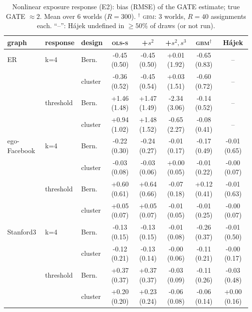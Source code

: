 \begin{table}[t]\centering\footnotesize\setlength{\tabcolsep}{3.5pt}
\caption{Nonlinear exposure response (E2): bias (RMSE) of the GATE estimate; true GATE $\approx2$. Mean over 6 worlds ($R{=}300$). $^\dagger$ \textsc{gbm}: 3 worlds, $R{=}40$ assignments each. ``--'': H\'ajek undefined in $\ge50\%$ of draws (or not run).}
\label{tab:extrap}
\begin{tabular}{lllccccc}\toprule
graph & response & design & \textsc{ols-s} & +$s^2$ & +$s^2,s^3$ & \textsc{gbm}$^\dagger$ & H\'ajek \\
\midrule
ER & k=4 & Bern. & -0.45 (0.50) & -0.45 (0.50) & +0.01 (1.92) & -0.65 (0.83) & -- \\
 &  & cluster & -0.36 (0.52) & -0.45 (0.54) & +0.03 (1.51) & -0.60 (0.72) & -- \\
 & threshold & Bern. & +1.46 (1.48) & +1.47 (1.49) & -2.34 (3.06) & -0.14 (0.52) & -- \\
 &  & cluster & +0.94 (1.02) & +1.48 (1.52) & -0.65 (2.27) & -0.08 (0.41) & -- \\
ego-Facebook & k=4 & Bern. & -0.22 (0.30) & -0.24 (0.27) & -0.01 (0.17) & -0.17 (0.49) & -0.01 (0.65) \\
 &  & cluster & -0.03 (0.08) & -0.03 (0.06) & +0.00 (0.05) & -0.01 (0.22) & -0.00 (0.07) \\
 & threshold & Bern. & +0.60 (0.61) & +0.64 (0.66) & -0.07 (0.18) & +0.12 (0.41) & -0.01 (0.63) \\
 &  & cluster & +0.05 (0.07) & +0.05 (0.07) & -0.01 (0.05) & -0.01 (0.25) & -0.00 (0.07) \\
Stanford3 & k=4 & Bern. & -0.13 (0.15) & -0.13 (0.15) & -0.01 (0.08) & -0.26 (0.37) & -0.01 (0.50) \\
 &  & cluster & -0.12 (0.21) & -0.13 (0.14) & -0.00 (0.06) & -0.11 (0.21) & -0.00 (0.17) \\
 & threshold & Bern. & +0.37 (0.37) & +0.37 (0.37) & -0.03 (0.09) & -0.11 (0.26) & -0.03 (0.48) \\
 &  & cluster & +0.20 (0.20) & +0.23 (0.24) & -0.06 (0.08) & -0.06 (0.14) & +0.00 (0.16) \\
\bottomrule\end{tabular}\end{table}
